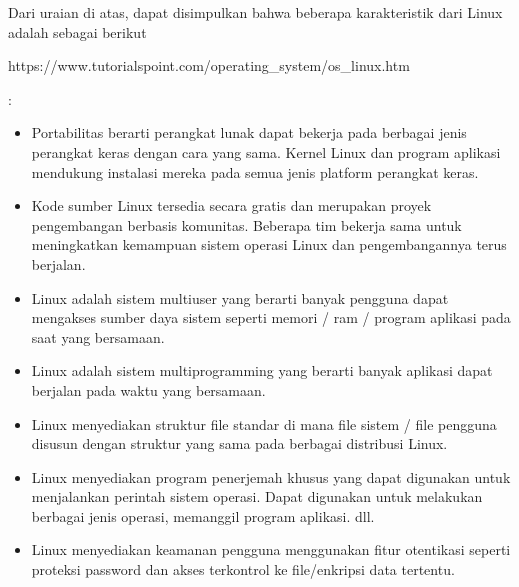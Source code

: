 \documentclass[letterpaper,10pt,english]{sphinxmanual}
\begin{document}
Dari uraian di atas, dapat disimpulkan bahwa beberapa karakteristik dari Linux adalah sebagai berikut %
\begin{footnote}[1]\sphinxAtStartFootnote
https://www.tutorialspoint.com/operating\_system/os\_linux.htm
%
\end{footnote}:
\begin{itemize}
\item {} 
 \sphinxhyphen{} Portabilitas berarti perangkat lunak dapat bekerja pada berbagai jenis perangkat keras dengan cara yang sama. Kernel Linux dan program aplikasi mendukung instalasi mereka pada semua jenis platform perangkat keras.

\item {} 
 \sphinxhyphen{} Kode sumber Linux tersedia secara gratis dan merupakan proyek pengembangan berbasis komunitas. Beberapa tim bekerja sama untuk meningkatkan kemampuan sistem operasi Linux dan pengembangannya terus berjalan.

\item {} 
 \sphinxhyphen{} Linux adalah sistem multiuser yang berarti banyak pengguna dapat mengakses sumber daya sistem seperti memori / ram / program aplikasi pada saat yang bersamaan.

\item {} 
 \sphinxhyphen{} Linux adalah sistem multiprogramming yang berarti banyak aplikasi dapat berjalan pada waktu yang bersamaan.

\item {} 
 \sphinxhyphen{} Linux menyediakan struktur file standar di mana file sistem / file pengguna disusun dengan struktur yang sama pada berbagai distribusi Linux.

\item {} 
 \sphinxhyphen{} Linux menyediakan program penerjemah khusus yang dapat digunakan untuk menjalankan perintah sistem operasi. Dapat digunakan untuk melakukan berbagai jenis operasi, memanggil program aplikasi. dll.

\item {} 
 \sphinxhyphen{} Linux menyediakan keamanan pengguna menggunakan fitur otentikasi seperti proteksi password dan akses terkontrol ke file/enkripsi data tertentu.

\end{itemize}
\end{document}
